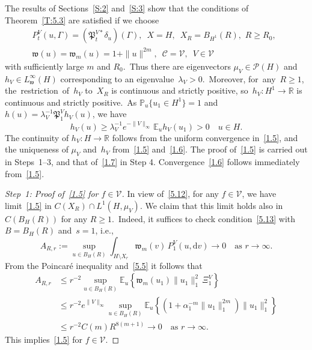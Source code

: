 \documentclass[10pt]{amsart}
\theoremstyle{definition}\newtheorem{defi}[theo]{Definition}\newtheorem{rema}[theo]{Remark}\newtheorem{exam}[theo]{Example}\newtheorem{exem}[theo]{Example}\newtheorem{nota}[theo]{Notation}
\newcommand{\R}{{\mathbb R}}
\newcommand{\pP}{{\mathbb P}}
\newcommand{\E}{{\mathbb E}}
\newcommand{\CC}{{\mathcal C}}
\newcommand{\PP}{{\mathcal P}}
\newcommand{\VV}{{\mathcal V}}
\newcommand{\la}{\lambda}
\newcommand{\ty}{\infty}
\newcommand{\wwww}{{\mathfrak w}}
\newcommand{\PPPP}{{\mathfrak P}}
\newcommand{\dd}{\mathrm{d}}
\newenvironment{step}{\begin{proof}}{\let\qed\relax \end{proof}}
\begin{document}
The results of Sections~\ref{S:2} and~\ref{S:3} show that the conditions of Theorem~\ref{T:5.3} are satisfied if we choose
\begin{gather*}
P_t^V(u,\Gamma)=(\PPPP_t^{V*} \delta_u) (\Gamma),\,\,\,X=H, \,\,\, X_R= B_{H^1}(R), \,\, R\ge R_0, \,\,\, \\
\wwww(u)=\wwww_m(u)=1+\|u\|^{2m},\,\,\, \CC= \VV, \,\,\, V\in \VV
\end{gather*}
with sufficiently large $m$ and $R_0$.~Thus there are eigenvectors $\mu_V\in \PP(H)$ and $h_V\in L_\wwww^\infty(H)$ corresponding to an eigenvalue~$\lambda_V>0$.~Moreover, for~any~$R\ge1$, the~restriction~of~$h_V$ to~$X_R$ is continuous and strictly positive, so~$h_V: H^1\to \R$ is continuous and strictly positive.~As $\pP_u\{u_1\in H^1\}=1$ and $h(u)=\la_V^{-1}\PPPP_1^Vh_V(u)$, we have
\[
h_V(u)\ge\lambda_V^{-1}e^{- \|V\|_\infty}\,\E_u h_V(u_{1})>0 \quad u\in H.
\]
The continuity of $h_V:H\to \R $ follows from the uniform convergence in~\eqref{1.5}, and the uniqueness of $\mu_V$ and~$h_V$ from~\eqref{1.5} and~\eqref{1.6}. The proof of~\eqref{1.5} is carried out in Steps~1--3, and that of~\eqref{1.7} in Step 4. Convergence~\eqref{1.6} follows immediately from~\eqref{1.5}.

\begin{step}[Step~1: Proof of~\eqref{1.5} for $f\in \VV$]
In view of~\eqref{5.12}, for any $f\in \VV$, we have limit~\eqref{1.5} in $C(X_R)\cap L^1(H,\mu_V)$. We claim that this limit holds also in~$C(B_H(R))$ for any $R\ge1$.~Indeed, it suffices to check condition~\eqref{5.13} with~$B=B_H(R)$ and~$s=1$, i.e.,
\[
A_{R,r}:= \sup_{u\in B_H(R)} \int_{H\setminus X_r}\wwww_m(v)\,P^V_1(u,\dd v) \to0
\quad\mbox{as $r\to\infty$}.
\]
From the Poincar\'e inequality and~\eqref{5.5} it follows that
\begin{align*}
A_{R,r}&\le r^{-2}\sup_{u\in B_H(R)} \E_u\left\{\wwww_m(u_1)\|u_1\|_1^2 \,\Xi_1^V \right\}\\&\le r^{-2}e^{\|V\|_\ty}\sup_{u\in B_H(R)} \E_u\left\{(1+\alpha_1^{-m}\|u_1\|_1^{2m})\|u_1\|_1^2 \right\} \\&\le r^{-2} C(m) R^{8(m+1)}\to 0\quad\text{as $r\to\ty$}.
\end{align*}
This implies~\eqref{1.5} for $f\in \VV$.
\end{step}
\end{document}
